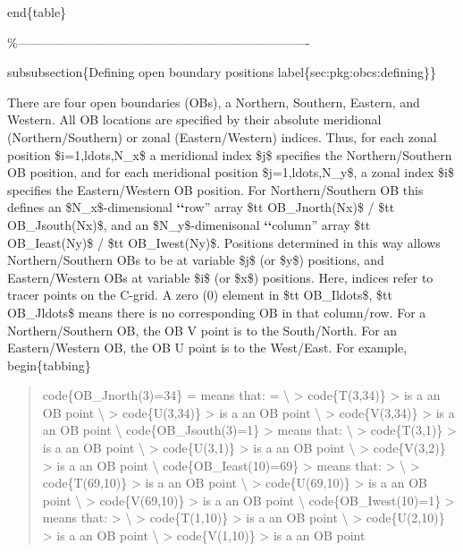 \documentclass[letterpaper,10pt,english]{sphinxmanual}
\begin{document}
end\{table\}

\%----------------------------------------------------------------------

subsubsection\{Defining open boundary positions
label\{sec:pkg:obcs:defining\}\}

There are four open boundaries (OBs), a
Northern, Southern, Eastern, and Western.
All OB locations are specified by their absolute
meridional (Northern/Southern) or zonal (Eastern/Western) indices.
Thus, for each zonal position \$i=1,ldots,N\_x\$ a meridional index
\$j\$ specifies the Northern/Southern OB position,
and for each meridional position \$j=1,ldots,N\_y\$, a zonal index
\$i\$ specifies the Eastern/Western OB position.
For Northern/Southern OB this defines an \$N\_x\$-dimensional
{\color{red}\bfseries{}{}`{}`}row'' array \$tt OB\_Jnorth(Nx)\$ / \$tt OB\_Jsouth(Nx)\$,
and an \$N\_y\$-dimenisonal
{\color{red}\bfseries{}{}`{}`}column'' array \$tt OB\_Ieast(Ny)\$ / \$tt OB\_Iwest(Ny)\$.
Positions determined in this way allows Northern/Southern
OBs to be at variable \$j\$ (or \$y\$) positions, and Eastern/Western
OBs at variable \$i\$ (or \$x\$) positions.
Here, indices refer to tracer points on the C-grid.
A zero (0) element in \$tt OB\_Ildots\$, \$tt OB\_Jldots\$
means there is no corresponding OB in that column/row.
For a Northern/Southern OB, the OB V point is to the South/North.
For an Eastern/Western OB, the OB U point is to the West/East.
For example,
begin\{tabbing\}
\begin{quote}

code\{OB\_Jnorth(3)=34\} =  means that:  = \textbackslash{}
\textgreater{} code\{T(3,34)\} \textgreater{} is a an OB point  \textbackslash{}
\textgreater{} code\{U(3,34)\} \textgreater{} is a an OB point \textbackslash{}
\textgreater{} code\{V(3,34)\} \textgreater{} is a an OB point \textbackslash{}
code\{OB\_Jsouth(3)=1\} \textgreater{} means that: \textbackslash{}
\textgreater{} code\{T(3,1)\} \textgreater{} is a an OB point \textbackslash{}
\textgreater{} code\{U(3,1)\} \textgreater{} is a an OB point \textbackslash{}
\textgreater{} code\{V(3,2)\} \textgreater{} is a an OB point \textbackslash{}
code\{OB\_Ieast(10)=69\} \textgreater{}  means that:  \textgreater{}  \textbackslash{}
\textgreater{} code\{T(69,10)\} \textgreater{} is a an OB point \textbackslash{}
\textgreater{} code\{U(69,10)\} \textgreater{} is a an OB point \textbackslash{}
\textgreater{} code\{V(69,10)\} \textgreater{} is a an OB point \textbackslash{}
code\{OB\_Iwest(10)=1\} \textgreater{}  means that:  \textgreater{}  \textbackslash{}
\textgreater{} code\{T(1,10)\} \textgreater{} is a an OB point \textbackslash{}
\textgreater{} code\{U(2,10)\} \textgreater{} is a an OB point \textbackslash{}
\textgreater{} code\{V(1,10)\} \textgreater{} is a an OB point
\end{quote}
\end{document}
